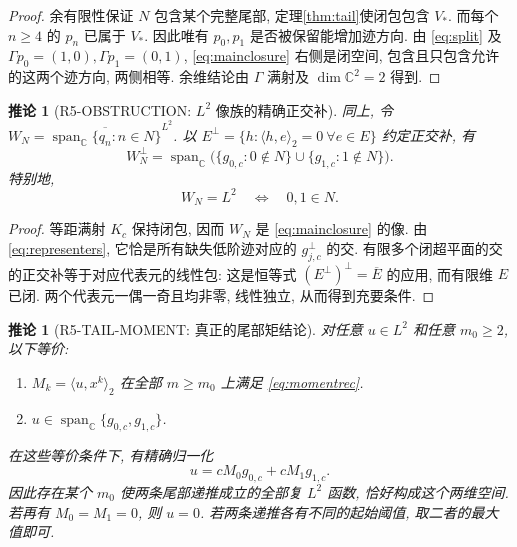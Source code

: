 \documentclass[UTF8,fontset=fandol,11pt,a4paper]{ctexart}
\newtheorem{corollary}[theorem]{推论}
\theoremstyle{definition}
\newcommand{\C}{\mathbb C}
\newcommand{\spn}{\operatorname{span}_{\C}}
\newcommand{\ip}[2]{\langle #1,#2\rangle_2}
\begin{document}
\begin{proof}
余有限性保证 $N$ 包含某个完整尾部, 定理\ref{thm:tail}使闭包包含 $V_*$.
而每个 $n\ge4$ 的 $p_n$ 已属于 $V_*$.
因此唯有 $p_0,p_1$ 是否被保留能增加迹方向.
由 \eqref{eq:split} 及 $\Gamma p_0=(1,0),\Gamma p_1=(0,1)$,
\eqref{eq:mainclosure} 右侧是闭空间, 包含且只包含允许的这两个迹方向,
两侧相等. 余维结论由 $\Gamma$ 满射及 $\dim\C^2=2$ 得到.
\end{proof}

\begin{corollary}[R5-OBSTRUCTION: $L^2$ 像族的精确正交补]\label{cor:obstruction}
同上, 令 $W_N=\overline{\spn\{q_n:n\in N\}}^{L^2}$.
以 $E^\perp=\{h:\ip{h}{e}=0\ \forall e\in E\}$ 约定正交补, 有
\begin{equation}\label{eq:obstructions}
\boxed{W_N^\perp=\spn\bigl(\{g_{0,c}:0\notin N\}
\cup\{g_{1,c}:1\notin N\}\bigr).}
\end{equation}
特别地,
\begin{equation}\label{eq:densecriterion}
W_N=L^2\quad\Longleftrightarrow\quad 0,1\in N.
\end{equation}
\end{corollary}

\begin{proof}
等距满射 $K_c$ 保持闭包, 因而 $W_N$ 是 \eqref{eq:mainclosure} 的像.
由 \eqref{eq:representers}, 它恰是所有缺失低阶迹对应的
$g_{j,c}^{\perp}$ 的交. 有限多个闭超平面的交的正交补等于对应代表元的线性包:
这是恒等式 $(E^\perp)^\perp=\overline E$ 的应用, 而有限维 $E$ 已闭.
两个代表元一偶一奇且均非零, 线性独立, 从而得到充要条件.
\end{proof}

\begin{corollary}[R5-TAIL-MOMENT: 真正的尾部矩结论]\label{cor:tailmoment}
对任意 $u\in L^2$ 和任意 $m_0\ge2$, 以下等价:
\begin{enumerate}
\item $M_k=\ip{u}{x^k}$ 在全部 $m\ge m_0$ 上满足 \eqref{eq:momentrec}.
\item $u\in\spn\{g_{0,c},g_{1,c}\}$.
\end{enumerate}
在这些等价条件下, 有精确归一化
\begin{equation}\label{eq:normalizedtail}
\boxed{u=cM_0g_{0,c}+cM_1g_{1,c}.}
\end{equation}
因此存在某个 $m_0$ 使两条尾部递推成立的全部复 $L^2$ 函数,
恰好构成这个两维空间. 若再有 $M_0=M_1=0$, 则 $u=0$.
若两条递推各有不同的起始阈值, 取二者的最大值即可.
\end{corollary}
\end{document}
